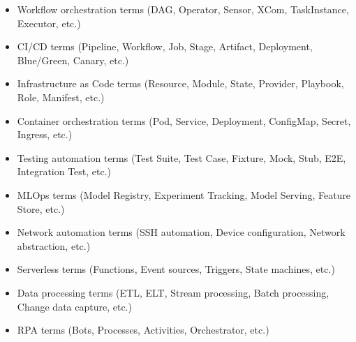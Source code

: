 \documentclass[11pt,a4paper]{article}
\begin{document}
\begin{itemize}
\item Workflow orchestration terms (DAG, Operator, Sensor, XCom, TaskInstance, Executor, etc.)
\end{itemize}

\begin{itemize}
\item CI/CD terms (Pipeline, Workflow, Job, Stage, Artifact, Deployment, Blue/Green, Canary, etc.)
\end{itemize}

\begin{itemize}
\item Infrastructure as Code terms (Resource, Module, State, Provider, Playbook, Role, Manifest, etc.)
\end{itemize}

\begin{itemize}
\item Container orchestration terms (Pod, Service, Deployment, ConfigMap, Secret, Ingress, etc.)
\end{itemize}

\begin{itemize}
\item Testing automation terms (Test Suite, Test Case, Fixture, Mock, Stub, E2E, Integration Test, etc.)
\end{itemize}

\begin{itemize}
\item MLOps terms (Model Registry, Experiment Tracking, Model Serving, Feature Store, etc.)
\end{itemize}

\begin{itemize}
\item Network automation terms (SSH automation, Device configuration, Network abstraction, etc.)
\end{itemize}

\begin{itemize}
\item Serverless terms (Functions, Event sources, Triggers, State machines, etc.)
\end{itemize}

\begin{itemize}
\item Data processing terms (ETL, ELT, Stream processing, Batch processing, Change data capture, etc.)
\end{itemize}

\begin{itemize}
\item RPA terms (Bots, Processes, Activities, Orchestrator, etc.)
\end{itemize}
\end{document}
